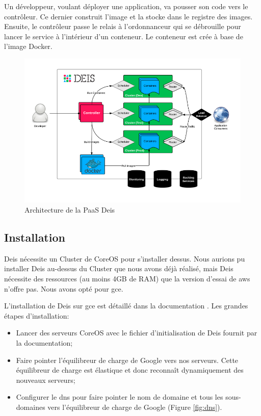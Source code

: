 \begin{onehalfspace}
Un développeur, voulant déployer une application, va pousser son code vers le contrôleur. Ce dernier construit l'image et la stocke dans le registre des images. Ensuite, le contrôleur passe le relais à l'ordonnanceur qui se débrouille pour lancer le service à l'intérieur d'un conteneur. Le conteneur est crée à base de l'image Docker.



\begin{figure}[H]
\centering
\includegraphics [scale=0.6]{chapitre5/assets/deis-architecture}
\caption{Architecture de la PaaS Deis}
\label{fig:deis-architecture}
\end{figure}


\subsection{Installation}


Deis nécessite un Cluster de CoreOS pour s'installer dessus. Nous aurions pu installer Deis au-dessus du Cluster que nous avons déjà réalisé, mais Deis nécessite des ressources (au moins 4GB de RAM) que la version d'essai de \acrshort{aws} n'offre pas. Nous avons opté pour \acrshort{gce}.

L'installation de Deis sur \acrshort{gce} est détaillé dans la documentation \cite{deis-gce}. Les grandes étapes d'installation:
\begin{itemize}
	\item Lancer des serveurs CoreOS avec le fichier d'initialisation de Deis fournit par la documentation;
	\item Faire pointer l'équilibreur de charge de Google vers nos serveurs. Cette équilibreur de charge est élastique et donc reconnaît dynamiquement des nouveaux serveurs;
	\item Configurer le \acrshort{dns} pour faire pointer le nom de domaine et tous les sous-domaines vers l'équilibreur de charge de Google (Figure \ref{fig:dns}).
\end{itemize}


\end{onehalfspace}

